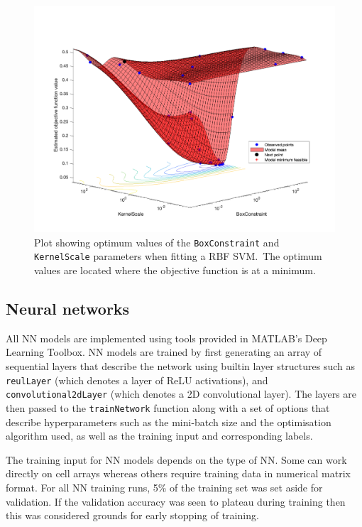 \begin{figure}[ht]
  \centering
  \includegraphics[width=\textwidth]{figures/rbf_optim.png}
  \caption{Plot showing optimum values of the \texttt{BoxConstraint} and
  \texttt{KernelScale} parameters when fitting a RBF SVM.\ The optimum values
are located where the objective function is at a
minimum.}\label{fig:rbf_optim}
\end{figure}

\subsection{Neural networks}

All NN models are implemented using tools provided in MATLAB's Deep Learning
Toolbox. NN models are trained by first generating an array of sequential layers
that describe the network using builtin layer structures such as
\texttt{reulLayer} (which denotes a layer of ReLU activations), and
\texttt{convolutional2dLayer} (which denotes a 2D convolutional layer). The
layers are then passed to the \texttt{trainNetwork} function along with a set of
options that describe hyperparameters such as the mini-batch size and the
optimisation algorithm used, as well as the training input and corresponding
labels.

The training input for NN models depends on the type of NN\@. Some can work
directly on cell arrays whereas others require training data in numerical matrix
format. For all NN training runs, 5\% of the training set was set aside for
validation. If the validation accuracy was seen to plateau during training then
this was considered grounds for early stopping of training.

